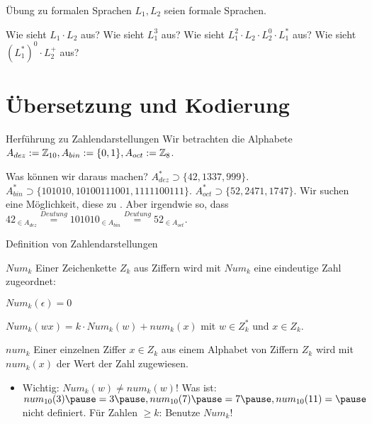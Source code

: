 \begin{frame}{Übung zu formalen Sprachen}
	$L_1, L_2$ seien formale Sprachen.
	\begin{itemize}
		\pitem Wie sieht $L_1 \cdot L_2$ aus?
		\pitem Wie sieht $L_1^3$ aus?
		\pitem Wie sieht $L_1^2 \cdot L_2 \cdot L_2^0 \cdot L_1^*$ aus?
		\pitem Wie sieht $(L_1^*)^0 \cdot L_2^+$ aus?
	\end{itemize}	
\end{frame}



\section{Übersetzung und Kodierung}

\begin{frame}{Herführung zu Zahlendarstellungen}
	\pause Wir betrachten die Alphabete $A_{dez} := \mathbb{Z}_{10}, A_{bin} := \{0, 1\}, A_{oct} := \mathbb{Z}_8$.
	\begin{itemize}
		\pitem Was können wir daraus machen?
		\pitem $A_{dez}^* \supset \{42, 1337, 999\}$.
		\pitem $A_{bin}^* \supset \{101010, 10100111001, 1111100111\}$.
		\pitem $A_{oct}^* \supset \{52, 2471, 1747\}$.
		\pitem Wir suchen eine Möglichkeit, diese  zu \markGreen{deuten}.
		\pitem Aber irgendwie so, dass $42_{\in A_{dez}} \stackrel{Deutung}{=} 101010_{\in A_{bin}} \stackrel{Deutung}{=} 52_{\in A_{oct}}$.
	\end{itemize}
\end{frame}

\begin{frame}{Definition von Zahlendarstellungen}
	\pause
	
	\begin{block}{$Num_k$}
		Einer Zeichenkette $Z_k$ aus Ziffern \p wird mit $Num_k$ eine eindeutige Zahl zugeordnet:
		
		\vspace{.2cm}
		
		\vspace{.2cm}
		
		 \p $Num_k(\epsilon) = 0$
		
		\vspace{.2cm}
		
		 \p $Num_k(wx) = k \cdot Num_k(w) + num_k(x)$ mit $w \in Z_k^*$ und $x \in Z_k$.
	\end{block}

	\pause
	
	\begin{block}{$num_k$}
		Einer einzelnen Ziffer $x \in Z_k$ aus einem Alphabet von Ziffern $Z_k$ wird mit $num_k(x)$ der Wert der Zahl zugewiesen.
	\end{block}

	\pause
	
	\begin{itemize}
		\item Wichtig: $Num_k(w) \neq num_k(w)$!
		\pitem Was ist: $num_{10}(3) \p = 3\p , num_{10}(7) \p = 7\p , num_{10}(11) = \p $ nicht definiert.
		\pitem Für Zahlen $\geq k$: Benutze $Num_k$!
	\end{itemize}
\end{frame}

